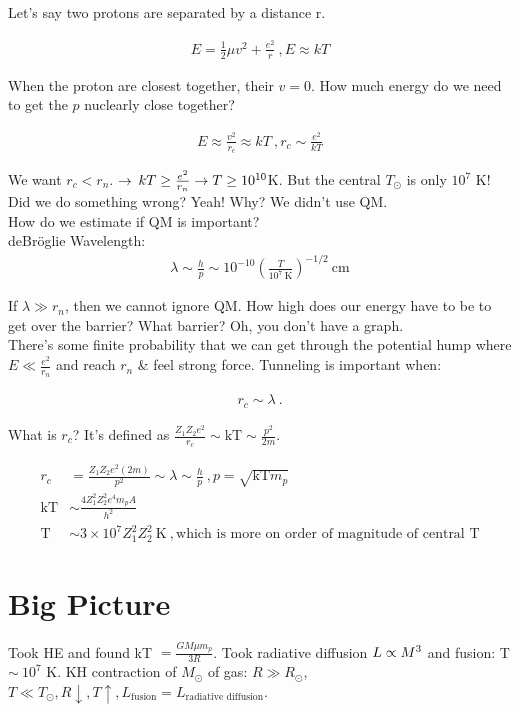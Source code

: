 Let's say two protons are separated by a distance r.

\begin{align}
E = \frac{1}{2} \mu v^2 + \frac{e^2}{r}~, E \approx kT
\end{align}

When the proton are closest together, their $v=0$. How much energy do we need to get the $p$ nuclearly close together? 

\begin{align}
E \approx \frac{v^2}{r_c} \approx kT~, r_c \sim \frac{e^2}{kT}
\end{align} 

We want $r_c < r_n$. $\rightarrow$ $kT \geq \frac{e^2}{r_n} \rightarrow T \geq 10^{10}$K. But the central $T_\odot$ is only $10^7$ K! Did we do something wrong? Yeah! Why? We didn't use QM.\\
How do we estimate if QM is important? \\

deBr\"oglie Wavelength:
\begin{align}
\lambda \sim \frac{h}{p} \sim 10^{-10} \left( \frac{T}{10^7 ~\text{K}} \right)^{-1/2}~ \text{cm}
\end{align}

If $\lambda \gg r_n$, then we cannot ignore QM. How high does our energy have to be to get over the barrier? What barrier? Oh, you don't have a graph.\\

There's some finite probability that we can get through the potential hump where $E \ll \frac{e^2}{r_n}$ and reach $r_n$ \& feel strong force. Tunneling is important when:

\begin{align}
r_c \sim \lambda ~.
\end{align}

What is $r_c$? It's defined as $\frac{Z_1 Z_2 e^2}{r_c} \sim \text{kT} \sim \frac{p^2}{2m}$. 

\begin{align}
r_c & = \frac{Z_1 Z_2 e^2 (2m)}{p^2} \sim \lambda \sim \frac{h}{p}~, p = \sqrt{\text{kT} m_p}\\
\text{kT} & \sim \frac{4 Z_1^2 Z_2^2 e^4 m_p A}{h^2}\\
\text{T} & \sim 3 \times 10^7 Z_1^2 Z_2^2 ~\text{K}~, \text{which is more on order of magnitude of central T}
\end{align}

\section{Big Picture}
Took HE and found kT $=\frac{GM \mu m_p}{3R}$. Took radiative diffusion $L \propto M^3$ and fusion: T $\sim~10^7$ K. KH contraction of $M_\odot$ of gas: $R \gg R_\odot$, $T \ll T_\odot,R \downarrow,T \uparrow, L_{\text{fusion}} = L_{\text{radiative diffusion}}$. 

